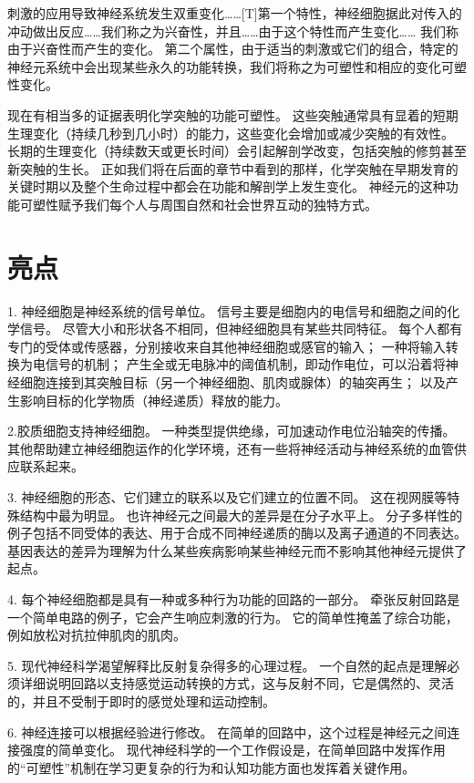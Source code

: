 刺激的应用导致神经系统发生双重变化……[T]第一个特性，神经细胞据此对传入的冲动做出反应……我们称之为兴奋性，并且……由于这个特性而产生变化…… 我们称由于兴奋性而产生的变化。 
第二个属性，由于适当的刺激或它们的组合，特定的神经元系统中会出现某些永久的功能转换，我们将称之为可塑性和相应的变化可塑性变化。


现在有相当多的证据表明化学突触的功能可塑性。 
这些突触通常具有显着的短期生理变化（持续几秒到几小时）的能力，这些变化会增加或减少突触的有效性。 
长期的生理变化（持续数天或更长时间）会引起解剖学改变，包括突触的修剪甚至新突触的生长。 
正如我们将在后面的章节中看到的那样，化学突触在早期发育的关键时期以及整个生命过程中都会在功能和解剖学上发生变化。 
神经元的这种功能可塑性赋予我们每个人与周围自然和社会世界互动的独特方式。



\section{亮点}
1. 神经细胞是神经系统的信号单位。 信号主要是细胞内的电信号和细胞之间的化学信号。 
尽管大小和形状各不相同，但神经细胞具有某些共同特征。 
每个人都有专门的受体或传感器，分别接收来自其他神经细胞或感官的输入； 
一种将输入转换为电信号的机制； 产生全或无电脉冲的阈值机制，即动作电位，可以沿着将神经细胞连接到其突触目标（另一个神经细胞、肌肉或腺体）的轴突再生； 以及产生影响目标的化学物质（神经递质）释放的能力。


2.胶质细胞支持神经细胞。 
一种类型提供绝缘，可加速动作电位沿轴突的传播。 
其他帮助建立神经细胞运作的化学环境，还有一些将神经活动与神经系统的血管供应联系起来。


3. 神经细胞的形态、它们建立的联系以及它们建立的位置不同。 
这在视网膜等特殊结构中最为明显。 
也许神经元之间最大的差异是在分子水平上。 
分子多样性的例子包括不同受体的表达、用于合成不同神经递质的酶以及离子通道的不同表达。 
基因表达的差异为理解为什么某些疾病影响某些神经元而不影响其他神经元提供了起点。


4. 每个神经细胞都是具有一种或多种行为功能的回路的一部分。 
牵张反射回路是一个简单电路的例子，它会产生响应刺激的行为。 
它的简单性掩盖了综合功能，例如放松对抗拉伸肌肉的肌肉。


5. 现代神经科学渴望解释比反射复杂得多的心理过程。 
一个自然的起点是理解必须详细说明回路以支持感觉运动转换的方式，这与反射不同，它是偶然的、灵活的，并且不受制于即时的感觉处理和运动控制。


6. 神经连接可以根据经验进行修改。 
在简单的回路中，这个过程是神经元之间连接强度的简单变化。 
现代神经科学的一个工作假设是，在简单回路中发挥作用的“可塑性”机制在学习更复杂的行为和认知功能方面也发挥着关键作用。


%












